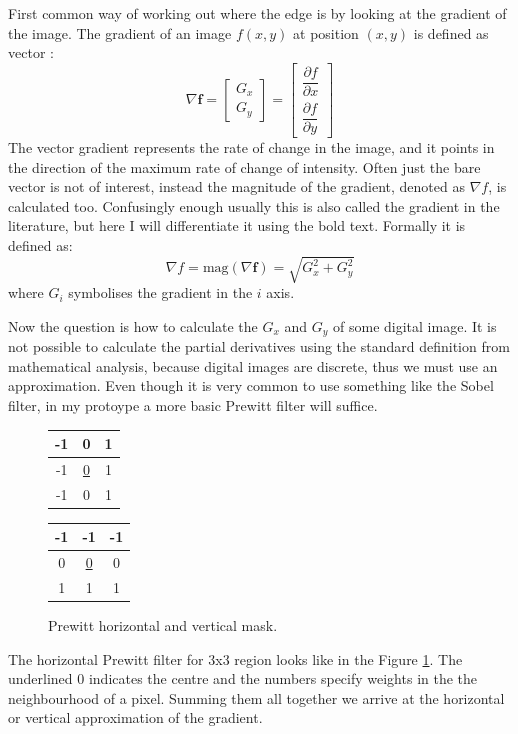 \documentclass[
  digital,     %
  oneside,     %
  nosansbold,  %
  nocolorbold, %
  lof,         %
  lot,         %
]{fithesis4}
\begin{document}
First common way of working out where the edge is by looking at the gradient of
the image. The gradient of an image $f(x,y)$ at position $(x, y)$ is defined as
vector
\parencite{gonzalez2002}:
$$\nabla \textbf{f} =
\begin{bmatrix}
    G_x \\
    G_y
\end{bmatrix} =
\begin{bmatrix}
    \dfrac{\partial f}{\partial x}\\[2ex]
    \dfrac{\partial f}{\partial y}
\end{bmatrix}$$
The vector gradient represents the rate of change in the image, and it points in
the direction of the maximum rate of change of intensity. Often just the bare
vector is not of interest, instead the magnitude of the gradient, denoted as
$\nabla f$, is calculated too. Confusingly enough usually this is also called
the gradient in the literature, but here I will differentiate it using the bold
text. Formally it is defined as:
$$\nabla f = \text{mag}(\nabla \textbf{f}) = \sqrt{G_x^2 + G_y^2}$$
where $G_i$ symbolises the gradient in the $i$ axis.

Now the question is how to calculate the $G_x$ and $G_y$ of some digital image.
It is not possible to calculate the partial derivatives using the standard
definition from mathematical analysis, because digital images are discrete, thus
we must use an approximation. Even though it is very common to use something
like the Sobel filter, in my protoype a more basic Prewitt filter will suffice.
\begin{figure}
    \begin{center}
        \begin{tabular}{ |c|c|c| }
            \hline
            -1 & 0 & 1 \\
            \hline
            -1 & \underline{0} & 1 \\
            \hline
            -1 & 0 & 1 \\
            \hline
        \end{tabular}
        \begin{tabular}{ |c|c|c| }
            \hline
            -1 & -1 & -1 \\
            \hline
            0 & \underline{0} & 0 \\
            \hline
            1 & 1 & 1 \\
            \hline
        \end{tabular}
    \end{center}
    \caption{Prewitt horizontal and vertical mask.}
    \label{table:prewitt}
\end{figure}
The horizontal Prewitt filter for 3x3 region looks like in the Figure
\ref{table:prewitt}.
The underlined 0 indicates the centre and the numbers specify weights in the the
neighbourhood of a pixel. Summing them all together we arrive at the horizontal or
vertical approximation of the gradient.
\end{document}
